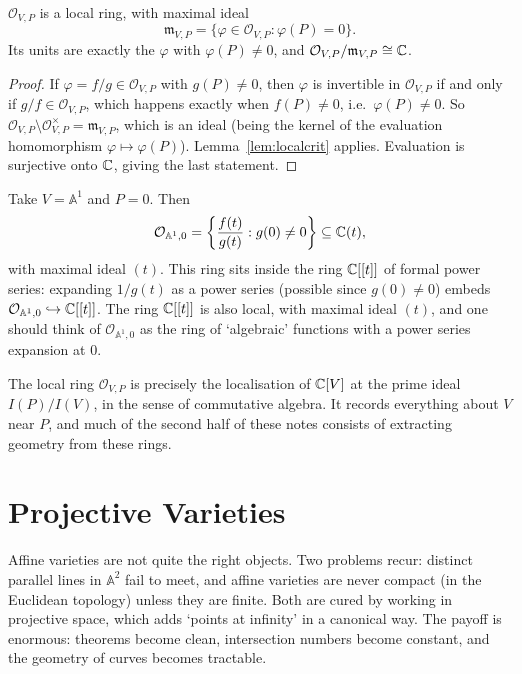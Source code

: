 \documentclass[a4paper]{scrartcl}
\newcommand{\A}{\mathbb{A}}
\newcommand{\mm}{\mathfrak{m}}
\newcommand{\Oh}{\mathcal{O}}
\begin{document}
\begin{proposition}
	$\Oh_{V,P}$ is a local ring, with maximal ideal
	$$\mm_{V,P} = \{\varphi \in \Oh_{V,P} : \varphi(P) = 0\}.$$
	Its units are exactly the $\varphi$ with $\varphi(P) \neq 0$, and $\Oh_{V,P}/\mm_{V,P} \cong \C$.
\end{proposition}

\begin{proof}
	If $\varphi = f/g \in \Oh_{V,P}$ with $g(P) \neq 0$, then $\varphi$ is invertible in $\Oh_{V,P}$ if and only if $g/f \in \Oh_{V,P}$, which happens exactly when $f(P) \neq 0$, i.e.\ $\varphi(P) \neq 0$. So $\Oh_{V,P}\setminus \Oh_{V,P}^\times = \mm_{V,P}$, which is an ideal (being the kernel of the evaluation homomorphism $\varphi \mapsto \varphi(P)$). Lemma~\ref{lem:localcrit} applies. Evaluation is surjective onto $\mathbb{C}$, giving the last statement.
\end{proof}

\begin{example}
	Take $V = \A^1$ and $P = 0$. Then
	$$\Oh_{\A^1,0} = \left\{ \frac{f(t)}{g(t)} : g(0) \neq 0 \right\} \subseteq \C(t),$$
	with maximal ideal $(t)$. This ring sits inside the ring $\mathbb{C}[[t]]$ of formal power series: expanding $1/g(t)$ as a power series (possible since $g(0) \neq 0$) embeds $\Oh_{\A^1,0} \hookrightarrow \C[[t]]$. The ring $\mathbb{C}[[t]]$ is also local, with maximal ideal $(t)$, and one should think of $\Oh_{\A^1,0}$ as the ring of `algebraic' functions with a power series expansion at $0$.
\end{example}

The local ring $\Oh_{V,P}$ is precisely the localisation of $\mathbb{C}[V]$ at the prime ideal $I(P)/I(V)$, in the sense of commutative algebra. It records everything about $V$ near $P$, and much of the second half of these notes consists of extracting geometry from these rings.

\section{Projective Varieties}

Affine varieties are not quite the right objects. Two problems recur: distinct parallel lines in $\A^2$ fail to meet, and affine varieties are never compact (in the Euclidean topology) unless they are finite. Both are cured by working in projective space, which adds `points at infinity' in a canonical way. The payoff is enormous: theorems become clean, intersection numbers become constant, and the geometry of curves becomes tractable.
\end{document}
